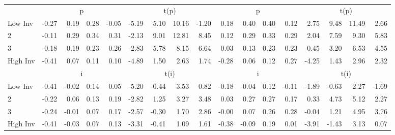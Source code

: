 \begin{table}[!ht]
\begin{tabular}{lrrrrrrrrrrrrrrrr}
  
    
      & \multicolumn{4}{c}{p} & \multicolumn{4}{c}{t(p)}
    
      & \multicolumn{4}{c}{p} & \multicolumn{4}{c}{t(p)}
    
    \\
      \cmidrule(r){2-5} \cmidrule(r){6-9} \cmidrule(r){10-13} \cmidrule(r){14-17}

    Low Inv   & -0.27  & 0.19  & 0.28  & -0.05  & -5.19  & 5.10  & 10.16  & -1.20  & 0.18  & 0.40  & 0.40  & 0.12  & 2.75  & 9.48  & 11.49  & 2.66  \\
           2  & -0.11  & 0.29  & 0.34  & 0.31  & -2.13  & 9.01  & 12.81  & 8.45  & 0.12  & 0.29  & 0.33  & 0.29  & 2.04  & 7.59  & 9.30  & 5.83  \\
           3  & -0.18  & 0.19  & 0.23  & 0.26  & -2.83  & 5.78  & 8.15  & 6.64  & 0.03  & 0.13  & 0.23  & 0.23  & 0.45  & 3.20  & 6.53  & 4.55  \\
    High Inv  & -0.41  & 0.07  & 0.11  & 0.10  & -4.89  & 1.50  & 2.63  & 1.74  & -0.28  & 0.06  & 0.12  & 0.27  & -4.25  & 1.43  & 2.96  & 2.32  \\

  
    
      & \multicolumn{4}{c}{i} & \multicolumn{4}{c}{t(i)}
    
      & \multicolumn{4}{c}{i} & \multicolumn{4}{c}{t(i)}
    
    \\
      \cmidrule(r){2-5} \cmidrule(r){6-9} \cmidrule(r){10-13} \cmidrule(r){14-17}

    Low Inv   & -0.41  & -0.02  & 0.14  & 0.05  & -5.20  & -0.44  & 3.53  & 0.82  & -0.18  & -0.04  & 0.12  & -0.11  & -1.89  & -0.63  & 2.27  & -1.69  \\
           2  & -0.22  & 0.06  & 0.13  & 0.19  & -2.82  & 1.25  & 3.27  & 3.48  & 0.03  & 0.27  & 0.27  & 0.17  & 0.33  & 4.73  & 5.12  & 2.27  \\
           3  & -0.24  & -0.01  & 0.07  & 0.17  & -2.57  & -0.30  & 1.70  & 2.86  & -0.00  & 0.07  & 0.26  & 0.28  & -0.04  & 1.21  & 4.95  & 3.76  \\
    High Inv  & -0.41  & -0.03  & 0.07  & 0.13  & -3.31  & -0.41  & 1.09  & 1.61  & -0.38  & -0.09  & 0.19  & 0.01  & -3.91  & -1.43  & 3.13  & 0.07  \\

  

  \bottomrule
\end{tabular}
\label{tbl:32_Size_BMm_Prior_F15}
\end{table}
